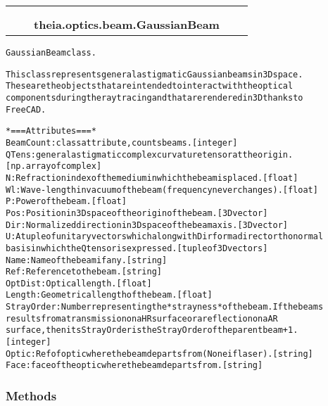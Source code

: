     \label{theia:optics:beam:GaussianBeam}
\begin{tabular}{cccccc}
\multicolumn{2}{r}{\settowidth{\BCL}{object}\multirow{2}{\BCL}{object}}
&&
  \\\cline{3-3}
  &&\multicolumn{1}{c|}{}
&&
  \\
&&\multicolumn{2}{l}{\textbf{theia.optics.beam.GaussianBeam}}
\end{tabular}

\begin{alltt}


GaussianBeam class.

This class represents general astigmatic Gaussian beams in 3D space.
These are the objects that are intended to interact with the optical
components during the ray tracing and that are rendered in 3D thanks to
FreeCAD.

*=== Attributes ===*
BeamCount: class attribute, counts beams. [integer]
QTens: general astigmatic complex curvature tensor at the origin.
    [np. array of complex]
N: Refraction index of the medium in which the beam is placed. [float]
Wl: Wave-length in vacuum of the beam (frequency never changes). [float]
P: Power of the beam. [float]
Pos: Position in 3D space of the origin of the beam. [3D vector]
Dir: Normalized direction in 3D space of the beam axis. [3D vector]
U: A tuple of unitary vectors which along with Dir form a direct orthonormal
    basis in which the Q tensor is expressed. [tuple of 3D vectors]
Name: Name of the beam if any. [string]
Ref: Reference to the beam. [string]
OptDist: Optical length. [float]
Length: Geometrical length of the beam. [float]
StrayOrder: Number representing the *strayness* of the beam. If the beams
    results from a transmission on a HR surface or a reflection on a AR
    surface, then its StrayOrder is the StrayOrder of the parent beam + 1.
    [integer]
Optic: Ref of optic where the beam departs from (None if laser). [string]
Face: face of the optic where the beam departs from. [string]
\end{alltt}



  \subsubsection{Methods}


